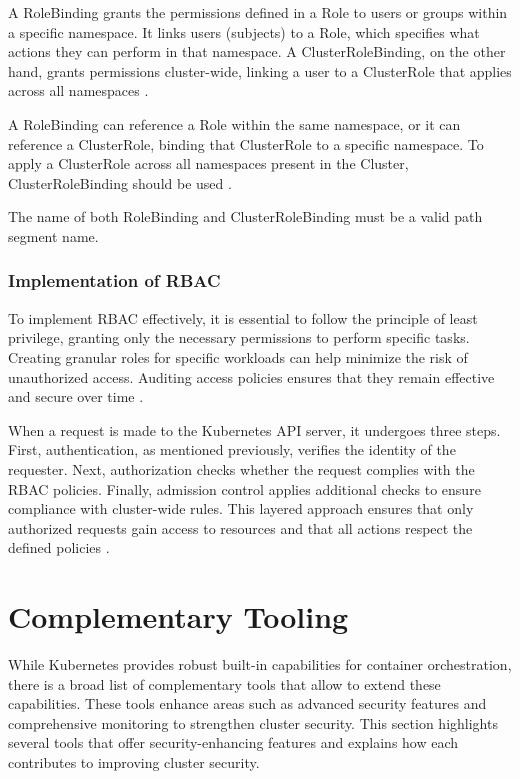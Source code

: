\documentclass[a4paper,11pt,openright,BCOR=15mm]{scrbook}
\begin{document}
A RoleBinding grants the permissions defined in a Role to users or groups within a specific namespace. It links users (subjects) to a Role, which specifies what actions they can perform in that namespace. A ClusterRoleBinding, on the other hand, grants permissions cluster-wide, linking a user to a ClusterRole that applies across all namespaces \cite{the_linux_foundation_rbacauthorization_2024}.

A RoleBinding can reference a Role within the same namespace, or it can reference a ClusterRole, binding that ClusterRole to a specific namespace. To apply a ClusterRole across all namespaces present in the Cluster, ClusterRoleBinding should be used \cite{the_linux_foundation_rbacauthorization_2024}.

The name of both RoleBinding and ClusterRoleBinding must be a valid path segment name.
	

\subsection{Implementation of RBAC}

To implement RBAC effectively, it is essential to follow the principle of least privilege, granting only the necessary permissions to perform specific tasks. Creating granular roles for specific workloads can help minimize the risk of unauthorized access. Auditing access policies ensures that they remain effective and secure over time \cite{rostami_role-based_2023}.

When a request is made to the Kubernetes API server, it undergoes three steps. First, authentication, as mentioned previously, verifies the identity of the requester. Next, authorization checks whether the request complies with the RBAC policies. Finally, admission control applies additional checks to ensure compliance with cluster-wide rules. This layered approach ensures that only authorized requests gain access to resources and that all actions respect the defined policies \cite{the_linux_foundation_rbacauthorization_2024}.




		
\chapter{Complementary Tooling}\label{chapt:comp}

While Kubernetes provides robust built-in capabilities for container orchestration, there is a broad list of complementary tools that allow to extend these capabilities.  These tools enhance areas such as advanced security features and comprehensive monitoring to strengthen cluster security. This section highlights several tools that offer security-enhancing features and explains how each contributes to improving cluster security.
\end{document}
